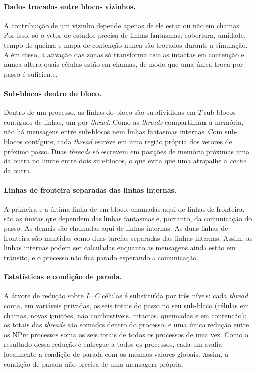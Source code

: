 \documentclass[11pt,a4paper]{article}
\begin{document}
\paragraph{Dados trocados entre blocos vizinhos.} A contribuição de um vizinho depende apenas de ele estar ou não em chamas. Por isso, só o vetor de estados precisa de linhas fantasmas; cobertura, umidade, tempo de queima e mapa de contenção nunca são trocados durante a simulação. Além disso, a ativação das zonas só transforma células intactas em contenção e nunca altera quais células estão em chamas, de modo que uma única troca por passo é suficiente.

\paragraph{Sub-blocos dentro do bloco.} Dentro de um processo, as linhas do bloco são subdivididas em $T$ sub-blocos contíguos de linhas, um por \emph{thread}. Como as \emph{threads} compartilham a memória, não há mensagens entre sub-blocos nem linhas fantasmas internas. Com sub-blocos contíguos, cada \emph{thread} escreve em uma região própria dos vetores de próximo passo. Duas \emph{threads} só escrevem em posições de memória próximas uma da outra no limite entre dois sub-blocos, o que evita que uma atrapalhe a \emph{cache} da outra.

\paragraph{Linhas de fronteira separadas das linhas internas.} A primeira e a última linha de um bloco, chamadas aqui de linhas de fronteira, são as únicas que dependem das linhas fantasmas e, portanto, da comunicação do passo. As demais são chamadas aqui de linhas internas. As duas linhas de fronteira são mantidas como duas tarefas separadas das linhas internas. Assim, as linhas internas podem ser calculadas enquanto as mensagens ainda estão em trânsito, e o processo não fica parado esperando a comunicação.

\paragraph{Estatísticas e condição de parada.} A árvore de redução sobre $L \cdot C$ células é substituída por três níveis: cada \emph{thread} conta, em variáveis privadas, os seis totais do passo no seu sub-bloco (células em chamas, novas ignições, não combustíveis, intactas, queimadas e em contenção); os totais das \emph{threads} são somados dentro do processo; e uma única redução entre os NPrc processos soma os seis totais de todos os processos de uma vez. Como o resultado dessa redução é entregue a todos os processos, cada um avalia localmente a condição de parada com os mesmos valores globais. Assim, a condição de parada não precisa de uma mensagem própria.
\end{document}
